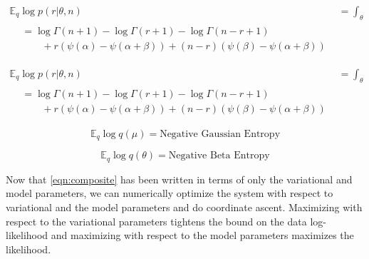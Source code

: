\documentclass[10pt, letterpaper]{article}
\newcommand{\E}{\mathbb{E}}
\begin{document}
\begin{align}
\E_q \log p(r | \theta, n) & = \int_\theta \\
\begin{split}
& = \log \Gamma(n+1) - \log \Gamma(r+1) - \log \Gamma(n-r+1) \\
& \qquad +r(\psi(\alpha)-\psi(\alpha + \beta)) +(n-r)(\psi(\beta) - \psi(\alpha+\beta))
\end{split}
\end{align}

\begin{align}
\E_q \log p(r | \theta, n) & = \int_\theta \\
\begin{split}
& = \log \Gamma(n+1) - \log \Gamma(r+1) - \log \Gamma(n-r+1) \\
& \qquad +r(\psi(\alpha)-\psi(\alpha + \beta)) +(n-r)(\psi(\beta) - \psi(\alpha+\beta))
\end{split}
\end{align}

\begin{equation}
\E_q \log q(\mu)  = \text{Negative Gaussian Entropy}
\end{equation}

\begin{equation}
\E_q \log q(\theta)  = \text{Negative Beta Entropy}
\end{equation}

Now that \eqref{eqn:composite} has been written in terms of only the variational and model parameters, we can numerically optimize the system with respect to variational and the model parameters and do coordinate ascent. Maximizing with respect to the variational parameters tightens the bound on the data log-likelihood and maximizing with respect to the model parameters maximizes the likelihood.
\end{document}
